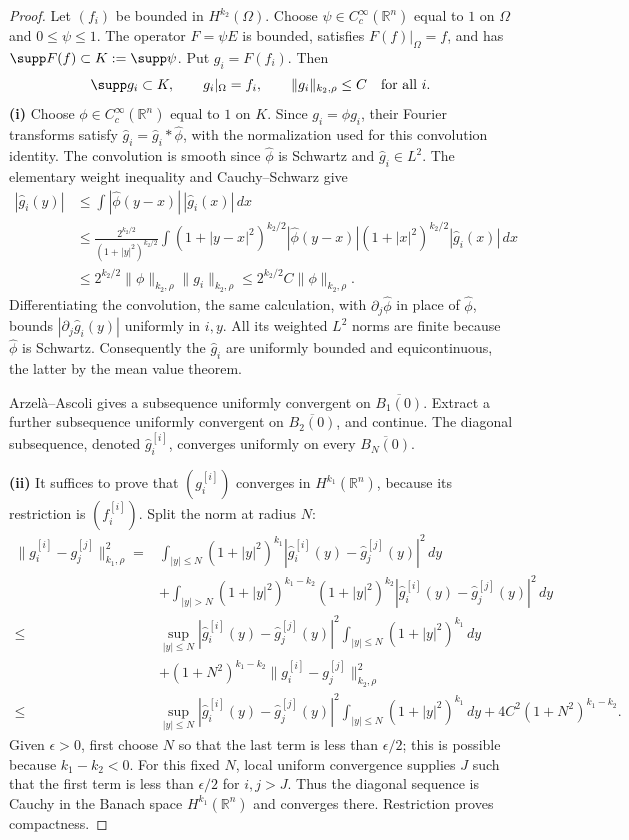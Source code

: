 \begin{proof}
Let $(f_i)$ be bounded in $H^{k_2}(\Omega)$.
Choose $\psi\in C_c^\infty(\mathbb R^n)$ equal to $1$ on $\Omega$ and
$0\leq\psi\leq1$. The operator $F=\psi E$ is bounded, satisfies
$F(f)|_\Omega=f$, and has $\supp F(f)\subset K:=\supp\psi$.
Put $g_i=F(f_i)$. Then
\[
\supp g_i\subset K,\qquad g_i|_\Omega=f_i,\qquad
\|g_i\|_{k_2,\rho}\leq C\quad\hbox{for all }i.
\]
\textbf{(i)} Choose $\phi\in C_c^\infty(\mathbb R^n)$ equal to $1$ on $K$.
Since $g_i=\phi g_i$, their Fourier transforms satisfy
$\widehat g_i=\widehat g_i*\widehat\phi$, with the normalization used for
this convolution identity. The convolution is smooth since
$\widehat\phi$ is Schwartz and $\widehat g_i\in L^2$.
The elementary weight inequality and Cauchy--Schwarz give
\begin{align*}
|\widehat g_i(y)|
&\leq\int|\widehat\phi(y-x)|\,|\widehat g_i(x)|\,dx\\
&\leq\frac{2^{k_2/2}}{(1+|y|^2)^{k_2/2}}
\int(1+|y-x|^2)^{k_2/2}|\widehat\phi(y-x)|
     (1+|x|^2)^{k_2/2}|\widehat g_i(x)|\,dx\\
&\leq2^{k_2/2}\|\phi\|_{k_2,\rho}\|g_i\|_{k_2,\rho}
\leq2^{k_2/2}C\|\phi\|_{k_2,\rho}.
\end{align*}
Differentiating the convolution, the same calculation, with
$\partial_j\widehat\phi$ in place of $\widehat\phi$, bounds
$|\partial_j\widehat g_i(y)|$ uniformly in $i,y$.
All its weighted $L^2$ norms are finite because $\widehat\phi$ is Schwartz.
Consequently the $\widehat g_i$ are uniformly bounded and equicontinuous,
the latter by the mean value theorem.

Arzel\`a--Ascoli gives a subsequence uniformly convergent on
$\overline{B_1(0)}$. Extract a further subsequence uniformly convergent
on $\overline{B_2(0)}$, and continue. The diagonal subsequence, denoted
$\widehat g_i^{[i]}$, converges uniformly on every $\overline{B_N(0)}$.

\textbf{(ii)} It suffices to prove that $(g_i^{[i]})$ converges in
$H^{k_1}(\mathbb R^n)$, because its restriction is $(f_i^{[i]})$.
Split the norm at radius $N$:
\begin{align*}
\|g_i^{[i]}-g_j^{[j]}\|_{k_1,\rho}^2
={}&\int_{|y|\leq N}(1+|y|^2)^{k_1}
 |\widehat g_i^{[i]}(y)-\widehat g_j^{[j]}(y)|^2\,dy\\
&+\int_{|y|>N}(1+|y|^2)^{k_1-k_2}(1+|y|^2)^{k_2}
 |\widehat g_i^{[i]}(y)-\widehat g_j^{[j]}(y)|^2\,dy\\
\leq{}&\sup_{|y|\leq N}|\widehat g_i^{[i]}(y)-\widehat g_j^{[j]}(y)|^2
 \int_{|y|\leq N}(1+|y|^2)^{k_1}\,dy\\
&+(1+N^2)^{k_1-k_2}\|g_i^{[i]}-g_j^{[j]}\|_{k_2,\rho}^2\\
\leq{}&\sup_{|y|\leq N}|\widehat g_i^{[i]}(y)-\widehat g_j^{[j]}(y)|^2
 \int_{|y|\leq N}(1+|y|^2)^{k_1}\,dy
 +4C^2(1+N^2)^{k_1-k_2}.
\end{align*}
Given $\epsilon>0$, first choose $N$ so that the last term is less
than $\epsilon/2$; this is possible because $k_1-k_2<0$.
For this fixed $N$, local uniform convergence supplies $J$ such that
the first term is less than $\epsilon/2$ for $i,j>J$.
Thus the diagonal sequence is Cauchy in the Banach space
$H^{k_1}(\mathbb R^n)$ and converges there. Restriction proves compactness.
\end{proof}
